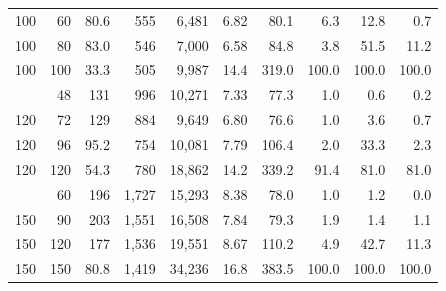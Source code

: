 \begin{table}[!t]
\begin{tabular*}{\columnwidth}{@{\extracolsep{\fill}}rrrrrrrrrr@{}}
100 & 60 & 80.6 & 555 & 6{,}481 & 6.82 & 80.1 & 6.3 & 12.8 & 0.7 \\
100 & 80 & 83.0 & 546 & 7{,}000 & 6.58 & 84.8 & 3.8 & 51.5 & 11.2 \\
100 & 100 & 33.3 & 505 & 9{,}987 & 14.4 & 319.0 & 100.0 & 100.0 & 100.0 \\
\addlinespace[1pt]
120 & 48 & 131 & 996 & 10{,}271 & 7.33 & 77.3 & 1.0 & 0.6 & 0.2 \\
120 & 72 & 129 & 884 & 9{,}649 & 6.80 & 76.6 & 1.0 & 3.6 & 0.7 \\
120 & 96 & 95.2 & 754 & 10{,}081 & 7.79 & 106.4 & 2.0 & 33.3 & 2.3 \\
120 & 120 & 54.3 & 780 & 18{,}862 & 14.2 & 339.2 & 91.4 & 81.0 & 81.0 \\
\addlinespace[1pt]
150 & 60 & 196 & 1{,}727 & 15{,}293 & 8.38 & 78.0 & 1.0 & 1.2 & 0.0 \\
150 & 90 & 203 & 1{,}551 & 16{,}508 & 7.84 & 79.3 & 1.9 & 1.4 & 1.1 \\
150 & 120 & 177 & 1{,}536 & 19{,}551 & 8.67 & 110.2 & 4.9 & 42.7 & 11.3 \\
150 & 150 & 80.8 & 1{,}419 & 34{,}236 & 16.8 & 383.5 & 100.0 & 100.0 & 100.0 \\
\bottomrule
\end{tabular*}
\end{table}
